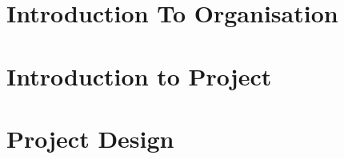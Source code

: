 \documentclass[12pt]{report}
\begin{document}

\begin{screen}
\ppttitle
\end{screen}
\footskip 0.7cm
\thispagestyle{empty} 
\pagetitle
\newpage
{}
\cfoot{\thepage}


\newpage



\newpage
\tableofcontents
\newpage
\listoffigures
\newpage

\cfoot{\thepage}

%
%

%
%
%
\newpage
\chapter{Introduction To Organisation}

\newpage
\chapter{Introduction to Project}

%
%
%
\chapter{Project Design}



%
\end{document}
